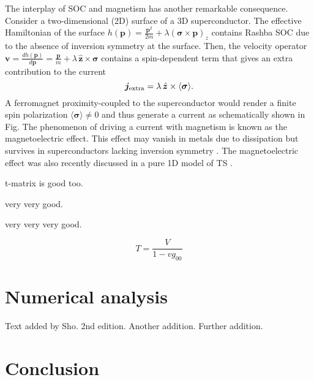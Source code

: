\documentclass[twocolumn,showpacs,floatfix,nofootinbib,longbibliography]{revtex4-1}
\begin{document}
The interplay of SOC and magnetism has another remarkable consequence. Consider a two-dimensional (2D) surface of a 3D superconductor. The effective Hamiltonian of the surface $h(\bm p) = \frac{{\bm p}^2}{2m} + \lambda\left( \bm\sigma\times\bm p\right)_z$ contains Rashba SOC due to the absence of inversion symmetry at the surface. Then, the velocity operator $\bm v= {\frac{dh(\bm p)}{d\bm p} =\frac{\bm p}{m}+ \lambda \,\hat{\bm z}\times\bm\sigma}$ contains a spin-dependent term that gives an extra contribution to the current
\begin{equation}
	\bm j_{\rm extra} = \lambda\,  \hat{\bm z}\times\langle\bm\sigma\rangle . \label{main}
\end{equation}
A ferromagnet proximity-coupled to the superconductor would render a finite spin polarization $\langle \bm \sigma \rangle \neq 0$ and thus generate a current as schematically shown in Fig. The phenomenon of driving a current with magnetism is known as the magnetoelectric effect. This effect may vanish in metals due to dissipation but survives in superconductors lacking inversion symmetry \cite{Levitov1985, Edelstein1989, Edelstein1995, Yip2001, BauerSigrist2012}. The magnetoelectric effect was also recently discussed in a pure 1D model of TS \cite{Ojanen2012}. 

t-matrix is good too.

very very good.

very very very good.


\begin{equation}
 T = \frac{V}{1-vg_{00}}
\end{equation}

\section{Numerical analysis} \label{sec:numerics}
Text added by Sho.
2nd edition. 
Another addition. 
Further addition.
\section{Conclusion} \label{sec:conclusion}




\newpage
%

\end{document}

